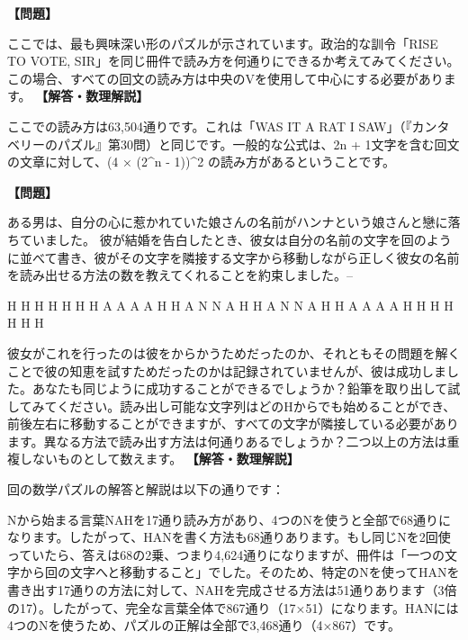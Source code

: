 \documentclass[10pt,a4paper,oneside,openany]{ltjsbook}
\begin{document}
\begin{tcolorbox}[colback=softblue,colframe=primaryblue,title=\textbf{第 258 問：選挙人のパズル （原題: THE VOTERS' PUZZLE.）},arc=2mm,boxrule=1pt,breakable]
\textbf{【問題】}\par\vspace{0.3em}
ここでは、最も興味深い形のパズルが示されています。政治的な訓令「RISE TO VOTE, SIR」を同じ冊件で読み方を何通りにできるか考えてみてください。この場合、すべての回文の読み方は中央のVを使用して中心にする必要があります。
\tcblower
\textbf{【解答・数理解説】}\par\vspace{0.3em}
ここでの読み方は63,504通りです。これは「WAS IT A RAT I SAW」（『カンタベリーのパズル』第30問）と同じです。一般的な公式は、2n + 1文字を含む回文の文章に対して、(4 × (2\textasciicircum{}n - 1))\textasciicircum{}2 の読み方があるということです。
\end{tcolorbox}

\begin{tcolorbox}[colback=softblue,colframe=primaryblue,title=\textbf{第 259 問：HANNAH'S PUZZLE.},arc=2mm,boxrule=1pt,breakable]
\textbf{【問題】}\par\vspace{0.3em}
ある男は、自分の心に惹かれていた娘さんの名前がハンナという娘さんと戀に落ちていました。
彼が結婚を告白したとき、彼女は自分の名前の文字を回のように並べて書き、彼がその文字を隣接する文字から移動しながら正しく彼女の名前を読み出せる方法の数を教えてくれることを約束しました。--

    H  H  H  H  H  H
    H  A  A  A  A  H
    H  A  N  N  A  H
    H  A  N  N  A  H
    H  A  A  A  A  H
    H  H  H  H  H  H

彼女がこれを行ったのは彼をからかうためだったのか、それともその問題を解くことで彼の知恵を試すためだったのかは記録されていませんが、彼は成功しました。あなたも同じように成功することができるでしょうか？鉛筆を取り出して試してみてください。読み出し可能な文字列はどのHからでも始めることができ、前後左右に移動することができますが、すべての文字が隣接している必要があります。異なる方法で読み出す方法は何通りあるでしょうか？二つ以上の方法は重複しないものとして数えます。
\tcblower
\textbf{【解答・数理解説】}\par\vspace{0.3em}
回の数学パズルの解答と解説は以下の通りです：

Nから始まる言葉NAHを17通り読み方があり、4つのNを使うと全部で68通りになります。したがって、HANを書く方法も68通りあります。もし同じNを2回使っていたら、答えは68の2乗、つまり4,624通りになりますが、冊件は「一つの文字から回の文字へと移動すること」でした。そのため、特定のNを使ってHANを書き出す17通りの方法に対して、NAHを完成させる方法は51通りあります（3倍の17）。したがって、完全な言葉全体で867通り（17×51）になります。HANには4つのNを使うため、パズルの正解は全部で3,468通り（4×867）です。
\end{tcolorbox}
\end{document}
